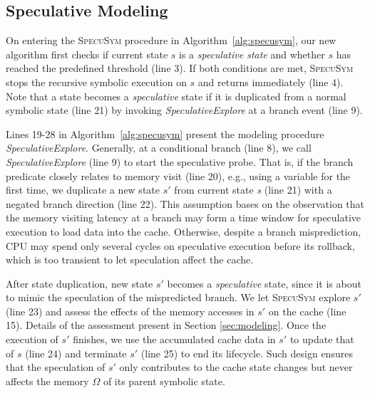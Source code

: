 \documentclass[sigconf]{acmart}
\newcommand{\SpecuSym}{\textsc{SpecuSym} }
\begin{document}
\subsection{Speculative Modeling}
\label{sec:spec_modeling}


On entering the \SpecuSym procedure in Algorithm~\ref{alg:specusym}, our new 
algorithm first checks if current state $s$ is a \textit{speculative state}
and whether $s$ has reached the predefined threshold (line 3). If both 
conditions are met, \SpecuSym stops the recursive symbolic execution on $s$ 
and returns immediately (line 4). Note that a state becomes a 
\textit{speculative} state if it is duplicated from a normal symbolic state 
(line 21) by invoking \textit{SpeculativeExplore} at a branch event (line 9). 




Lines 19-28 in Algorithm~\ref{alg:specusym} present the modeling procedure 
\textit{SpeculativeExplore}. Generally, at a conditional branch (line 8), 
we call \textit{SpeculativeExplore} (line 9) to start the speculative probe. 
That is, if the branch predicate closely relates to memory visit (line 20), 
e.g., using a variable for the first time, we duplicate a new state $s'$ 
from current state \textit{s} (line 21) with a negated branch direction 
(line 22). This assumption bases on the observation that the memory visiting 
latency at a branch may form a time window for speculative execution to load 
data into the cache. Otherwise, despite a branch misprediction, CPU may spend 
only several cycles on speculative execution before its rollback, which is too 
transient to let speculation affect the cache.


After state duplication, new state ${s'}$ becomes a \textit{speculative} state, 
since it is about to mimic the speculation of the mispredicted branch. We let 
\SpecuSym explore $s'$ (line 23) and assess the effects of the memory accesses 
in $s'$ on the cache (line 15). Details of the assessment present in Section
\ref{sec:modeling}. Once the execution of $s'$ finishes, we use the accumulated 
cache data in $s'$ to update that of $s$ (line 24) and terminate $s'$ (line 25) 
to end its lifecycle. Such design ensures that the speculation of $s'$ only 
contributes to the cache state changes but never affects the memory $\Omega$ of 
its parent symbolic state.
\end{document}

